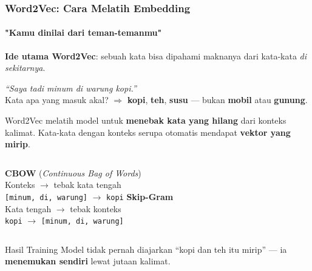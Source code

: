\documentclass[t,aspectratio=169,xcolor=dvipsnames]{beamer}
\begin{document}
\begin{frame}
    \frametitle{Word2Vec: Cara Melatih Embedding}
    \framesubtitle{"Kamu dinilai dari teman-temanmu"}
    \small
    \textbf{Ide utama Word2Vec}: sebuah kata bisa dipahami maknanya dari kata-kata \textit{di sekitarnya}.

    \vspace{0.15em}
    \begin{tcolorbox}[colback=nyublue!8, colframe=nyublue!50]
        \centering
        \textit{``Saya tadi minum \underline{\hspace{1.2cm}} di warung kopi.''}\\
        \small Kata apa yang masuk akal? $\Rightarrow$ \textbf{kopi}, \textbf{teh}, \textbf{susu} --- bukan \textbf{mobil} atau \textbf{gunung}.
    \end{tcolorbox}
    \vspace{0.15em}
    Word2Vec melatih model untuk \textbf{menebak kata yang hilang} dari konteks kalimat.
    Kata-kata dengan konteks serupa otomatis mendapat \textbf{vektor yang mirip}.
    \vspace{0.2em}
    \begin{columns}[T]
        \textbf{CBOW} (\textit{Continuous Bag of Words})\\
        \small Konteks $\rightarrow$ tebak kata tengah\\
        \texttt{[minum, di, warung]} $\rightarrow$ \texttt{kopi}
        \textbf{Skip-Gram}\\
        \small Kata tengah $\rightarrow$ tebak konteks\\
        \texttt{kopi} $\rightarrow$ \texttt{[minum, di, warung]}
    \end{columns}
    \vspace{0.2em}
    \begin{exampleblock}{Hasil Training}
        Model tidak pernah diajarkan ``kopi dan teh itu mirip'' --- ia \textbf{menemukan sendiri} lewat jutaan kalimat.
    \end{exampleblock}
\end{frame}
\end{document}
